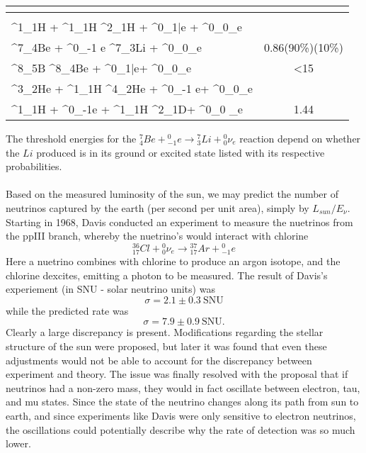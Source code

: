 \documentclass[10pt,letterpaper]{article}
\begin{document}
                \begin{table} [H]
                \centering
                \begin{tabular}{LC}
                \\
                \midrule
			& \\ 
			\midrule
	{}^1_1H + {}^1_1H \to {}^2_1H + {}^0_1\bar e + {}^0_0\nu_e&\\
	 {}^7_4Be +  {}^0_{-1} e \to {}^7_3Li + {}^0_0\nu_e&0.86(90\%)(10\%)\\
	 {}^8_5B  \to {}^8_4Be + {}^0_1\bar e+  {}^0_0\nu_e&<15\\
	 {}^3_2He + {}^1_1H \to {}^4_2He + {}^0_{-1} e+ {}^0_0\nu_e&\\
	 {}^1_1H + {}^0_{-1}e + {}^1_1H \to {}^2_1D+ {}^0_0 \nu_e&1.44\\
		\midrule

                \end{tabular}
                \end{table}
 The threshold energies for the $ {}^7_4Be +  {}^0_{-1} e \to {}^7_3Li + {}^0_0\nu_e$ reaction depend on whether the $Li$ produced is in its ground or excited state listed with its respective probabilities.  
 \\ \\
 Based on the measured luminosity of the sun, we may predict the number of neutrinos captured by the earth (per second per unit area), simply by $L_{sun}/E_{\nu}$. Starting in 1968, Davis conducted an experiment to measure the nuetrinos from the ppIII branch, whereby the nuetrino's would interact with chlorine
 \[
 	{}^{36}_{17}Cl+{}^0_0\nu_e \to {}^{37}_{17}Ar+{}^0_{-1}e
\]
Here a nuetrino combines with chlorine to produce an argon isotope, and the chlorine dexcites, emitting a photon to be measured. The result of Davis's experiement (in SNU - solar neutrino units) was
\[
	\sigma = 2.1\pm0.3\ \text{SNU}
\]
while the predicted rate was
\[
	\sigma = 7.9\pm0.9\ \text{SNU}.
\]
Clearly a large discrepancy is present. Modifications regarding the stellar structure of the sun were proposed, but later it was found that even these adjustments would not be able to account for the discrepancy between experiment and theory. The issue was finally resolved with the proposal that if neutrinos had a non-zero mass, they would in fact oscillate between electron, tau, and mu states. Since the state of the neutrino changes along its path from sun to earth, and since experiments like Davis were only sensitive to electron neutrinos, the oscillations could potentially describe why the rate of detection was so much lower. 
\end{document}
